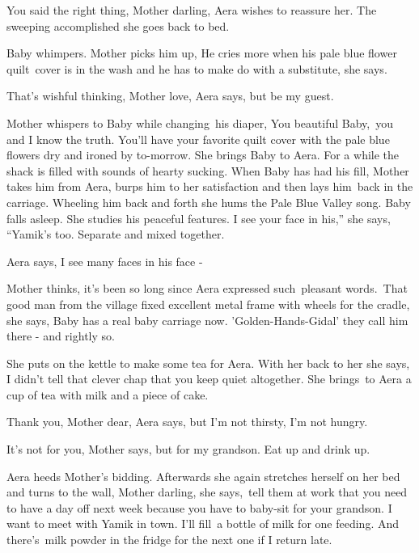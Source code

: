 \documentclass[letterpaper]{article}
\begin{document}
{\textquotedbl}You said the right thing, Mother darling,{\textquotedbl} Aera wishes to reassure her. The sweeping
accomplished she goes back to bed.\ 

Baby whimpers. Mother picks him up, {\textquotedbl}He cries more when his pale blue flower quilt\ cover is in the wash
and he has to make do with a substitute,{\textquotedbl} she says. 

{\textquotedbl}That's wishful thinking, Mother love,{\textquotedbl} Aera says, {\textquotedbl}but be my
guest.{\textquotedbl}\ 

Mother whispers to Baby while changing~his diaper, {\textquotedbl}You beautiful Baby,~you and I know the truth. You{}'ll
have your favorite quilt cover with the pale blue flowers dry and ironed by to-morrow.{\textquotedbl} She brings Baby
to Aera. For a while the shack is filled with sounds of hearty sucking. When Baby has had his fill, Mother takes him
from Aera, burps him to her satisfaction and then lays him~back in the carriage. Wheeling him back and forth she hums
the Pale Blue Valley song. Baby falls asleep. She studies his peaceful features. {\textquotedbl}I see your face in
his,{}'' she says, ``Yamik's too. Separate and mixed together.{\textquotedbl} 

Aera says, {\textquotedbl}I see many faces in his face -{\textquotedbl}~ 

Mother thinks, it's been so long since Aera expressed such\textcolor{red}{\ }pleasant words.\ {\textquotedbl}That good
man from the village fixed excellent metal frame with wheels for the cradle,{\textquotedbl} she says,
{\textquotedbl}Baby has a real baby carriage now. 'Golden-Hands-Gidal' they call him there - and rightly
so.{\textquotedbl} 

She puts on the kettle to make some tea for Aera. With her back to her she says, {\textquotedbl}I didn't tell that
clever chap that you keep quiet altogether.{\textquotedbl} She brings\  to Aera a cup of tea with milk and a piece of
cake. 

{\textquotedbl}Thank you, Mother dear,{\textquotedbl} Aera says, {\textquotedbl}but I'm not thirsty, I'm not
hungry.{\textquotedbl} 

{\textquotedbl}It's not for you,{\textquotedbl} Mother says, {\textquotedbl}but for my grandson. Eat up and drink
up.{\textquotedbl} 

Aera heeds Mother's bidding. Afterwards she again stretches herself on her bed and turns to the wall,
{\textquotedbl}Mother darling,{\textquotedbl} she says,\ {\textquotedbl}tell them at work that you need to have a day
off next week because you have to baby-sit for your grandson. I want to meet with Yamik in town. I'll fill~a bottle of
milk for one feeding. And there's~milk powder in the fridge for the next one if I return late.{\textquotedbl}
\end{document}
